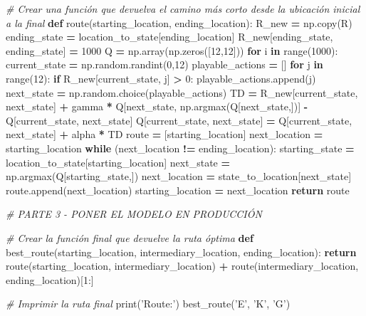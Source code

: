 \documentclass[]{book}
\newenvironment{Shaded}{\begin{snugshade}}{\end{snugshade}}
\newcommand{\BuiltInTok}[1]{#1}
\newcommand{\CommentTok}[1]{\textcolor[rgb]{0.56,0.35,0.01}{\textit{#1}}}
\newcommand{\ControlFlowTok}[1]{\textcolor[rgb]{0.13,0.29,0.53}{\textbf{#1}}}
\newcommand{\DecValTok}[1]{\textcolor[rgb]{0.00,0.00,0.81}{#1}}
\newcommand{\KeywordTok}[1]{\textcolor[rgb]{0.13,0.29,0.53}{\textbf{#1}}}
\newcommand{\NormalTok}[1]{#1}
\newcommand{\OperatorTok}[1]{\textcolor[rgb]{0.81,0.36,0.00}{\textbf{#1}}}
\newcommand{\StringTok}[1]{\textcolor[rgb]{0.31,0.60,0.02}{#1}}
\begin{document}
\begin{Shaded}
\begin{Highlighting}[]
\CommentTok{# Crear una función que devuelva el camino más corto desde la ubicación inicial a la final}
\KeywordTok{def}\NormalTok{ route(starting_location, ending_location):}
\NormalTok{    R_new }\OperatorTok{=}\NormalTok{ np.copy(R)}
\NormalTok{    ending_state }\OperatorTok{=}\NormalTok{ location_to_state[ending_location]}
\NormalTok{    R_new[ending_state, ending_state] }\OperatorTok{=} \DecValTok{1000}
\NormalTok{    Q }\OperatorTok{=}\NormalTok{ np.array(np.zeros([}\DecValTok{12}\NormalTok{,}\DecValTok{12}\NormalTok{]))}
    \ControlFlowTok{for}\NormalTok{ i }\KeywordTok{in} \BuiltInTok{range}\NormalTok{(}\DecValTok{1000}\NormalTok{):}
\NormalTok{        current_state }\OperatorTok{=}\NormalTok{ np.random.randint(}\DecValTok{0}\NormalTok{,}\DecValTok{12}\NormalTok{)}
\NormalTok{        playable_actions }\OperatorTok{=}\NormalTok{ []}
        \ControlFlowTok{for}\NormalTok{ j }\KeywordTok{in} \BuiltInTok{range}\NormalTok{(}\DecValTok{12}\NormalTok{):}
            \ControlFlowTok{if}\NormalTok{ R_new[current_state, j] }\OperatorTok{>} \DecValTok{0}\NormalTok{:}
\NormalTok{                playable_actions.append(j)}
\NormalTok{        next_state }\OperatorTok{=}\NormalTok{ np.random.choice(playable_actions)}
\NormalTok{        TD }\OperatorTok{=}\NormalTok{ R_new[current_state, next_state]}
             \OperatorTok{+}\NormalTok{ gamma }\OperatorTok{*}\NormalTok{ Q[next_state, np.argmax(Q[next_state,])]}
             \OperatorTok{-}\NormalTok{ Q[current_state, next_state]}
\NormalTok{        Q[current_state, next_state] }\OperatorTok{=}\NormalTok{ Q[current_state, next_state] }\OperatorTok{+}\NormalTok{ alpha }\OperatorTok{*}\NormalTok{ TD}
\NormalTok{    route }\OperatorTok{=}\NormalTok{ [starting_location]}
\NormalTok{    next_location }\OperatorTok{=}\NormalTok{ starting_location}
    \ControlFlowTok{while}\NormalTok{ (next_location }\OperatorTok{!=}\NormalTok{ ending_location):}
\NormalTok{        starting_state }\OperatorTok{=}\NormalTok{ location_to_state[starting_location]}
\NormalTok{        next_state }\OperatorTok{=}\NormalTok{ np.argmax(Q[starting_state,])}
\NormalTok{        next_location }\OperatorTok{=}\NormalTok{ state_to_location[next_state]}
\NormalTok{        route.append(next_location)}
\NormalTok{        starting_location }\OperatorTok{=}\NormalTok{ next_location}
    \ControlFlowTok{return}\NormalTok{ route}

\CommentTok{# PARTE 3 - PONER EL MODELO EN PRODUCCIÓN}

\CommentTok{# Crear la función final que devuelve la ruta óptima}
\KeywordTok{def}\NormalTok{ best_route(starting_location, intermediary_location, ending_location):}
    \ControlFlowTok{return}\NormalTok{ route(starting_location, intermediary_location)}
           \OperatorTok{+}\NormalTok{ route(intermediary_location, ending_location)[}\DecValTok{1}\NormalTok{:]}

\CommentTok{# Imprimir la ruta final}
\BuiltInTok{print}\NormalTok{(}\StringTok{'Route:'}\NormalTok{)}
\NormalTok{best_route(}\StringTok{'E'}\NormalTok{, }\StringTok{'K'}\NormalTok{, }\StringTok{'G'}\NormalTok{)}
\end{Highlighting}
\end{Shaded}
\end{document}
